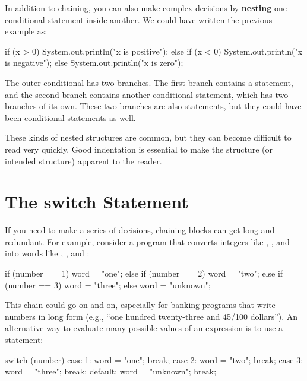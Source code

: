 
In addition to chaining, you can also make complex decisions by {\bf nesting} one conditional statement inside another.
We could have written the previous example as:

\begin{code}
if (x > 0) {
    System.out.println("x is positive");
} else {
    if (x < 0) {
        System.out.println("x is negative");
    } else {
        System.out.println("x is zero");
    }
}
\end{code}

The outer conditional has two branches.
The first branch contains a  statement, and the second branch contains another conditional statement, which has two branches of its own.
These two branches are also  statements, but they could have been conditional statements as well.


These kinds of nested structures are common, but they can become difficult to read very quickly.
Good indentation is essential to make the structure (or intended structure) apparent to the reader.


\section{The switch Statement}

If you need to make a series of decisions, chaining  blocks can get long and redundant.
For example, consider a program that converts integers like , , and  into words like , , and :

\begin{code}
if (number == 1) {
    word = "one";
} else if (number == 2) {
    word = "two";
} else if (number == 3) {
    word = "three";
} else {
    word = "unknown";
}
\end{code}


This chain could go on and on, especially for banking programs that write numbers in long form (e.g., ``one hundred twenty-three and 45/100 dollars'').
An alternative way to evaluate many possible values of an expression is to use a  statement:

\begin{code}
switch (number) {
    case 1:
        word = "one";
        break;
    case 2:
        word = "two";
        break;
    case 3:
        word = "three";
        break;
    default:
        word = "unknown";
        break;
}
\end{code}

